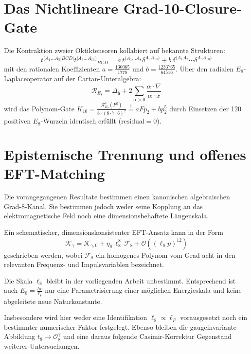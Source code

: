 \documentclass[11pt,a4paper]{article}
\begin{document}
\section{Das Nichtlineare Grad-10-Closure-Gate}
Die Kontraktion zweier Oktiktensoren kollabiert auf bekannte Strukturen:
$$t^{(A_1 \dots A_5 | BCD |} t^{|A_6 \dots A_{10})} {}_{BCD} = a \, t^{(A_1 \dots A_8} \delta^{A_9 A_{10})} + b \, \delta^{(A_1 A_2} \cdots \delta^{A_9 A_{10})}$$
mit den rationalen Koeffizienten $a = \frac{130065}{1778}$ und $b = \frac{1233765}{64516}$. Über den radialen $E_8$-Laplaceoperator auf der Cartan-Unteralgebra:
$$\mathcal{R}_{E_8} = \Delta_{\mathfrak{h}} + 2\sum_{\alpha>0} \frac{\alpha \cdot \nabla}{\alpha \cdot x}$$
wird das Polynom-Gate $K_{10} = \frac{\mathcal{R}_{E_8}^3 (F^2)}{8 \cdot (8 \cdot 7 \cdot 6)^2} \stackrel{!}{=} a F p_2 + b p_2^5$ durch Einsetzen der 120 positiven $E_8$-Wurzeln identisch erfüllt ($\text{residual} = 0$).

\section{Epistemische Trennung und offenes EFT-Matching}
Die vorangegangenen Resultate bestimmen einen kanonischen algebraischen Grad-8-Kanal. Sie bestimmen jedoch weder seine Kopplung an das elektromagnetische Feld noch eine dimensionsbehaftete Längenskala.

Ein schematischer, dimensionskonsistenter EFT-Ansatz kann in der Form
\[
\mathscr{K}_\gamma
=
\mathscr{K}_{\gamma,0}
+
\eta_8\,\ell_8^8\,
\mathscr{F}_8
+
\mathcal{O}\left((\ell_8 p)^{12}\right)
\]
geschrieben werden, wobei $\mathscr{F}_8$ ein homogenes Polynom vom Grad acht in den relevanten Frequenz- und Impulsvariablen bezeichnet.

Die Skala $\ell_8$ bleibt in der vorliegenden Arbeit unbestimmt. Entsprechend ist auch $E_8 = \frac{\hbar c}{\ell_8}$ nur eine Parametrisierung einer möglichen Energieskala und keine abgeleitete neue Naturkonstante.

Insbesondere wird hier weder eine Identifikation $\ell_8 \propto \ell_P$ vorausgesetzt noch ein bestimmter numerischer Faktor festgelegt. Ebenso bleiben die gaugeinvariante Abbildung $t_8 \longrightarrow \mathcal{O}^\gamma_8$ und eine daraus folgende Casimir-Korrektur Gegenstand weiterer Untersuchungen.
\end{document}
